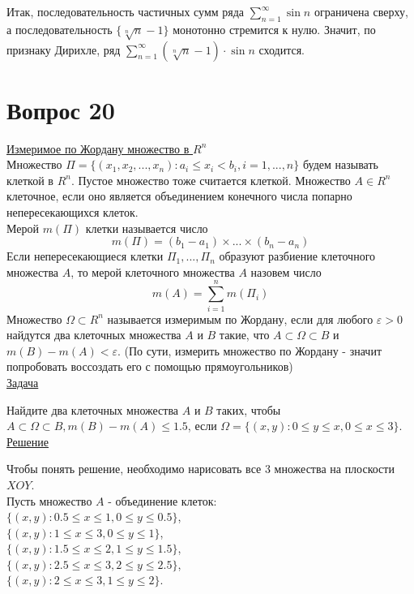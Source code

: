 \documentclass{report}
\begin{document}
Итак, последовательность частичных сумм ряда \( \sum_{n = 1}^{\infty} \sin n \) ограничена сверху, а последовательность \( \{ \sqrt[n]{n} - 1 \} \) монотонно стремится к нулю. Значит, по признаку Дирихле, ряд \( \sum_{n = 1}^{\infty} (\sqrt[n]{n} - 1) \cdot \sin n \) сходится.

\newpage

\section{Вопрос 20}
\underline{Измеримое по Жордану множество в $R^{n}$}\\

Множество $\Pi = \{(x_{1}, x_{2}, ... , x_{n}): a_{i} \leq x_{i} < b_{i}, i = 1, ... , n\}$ будем называть клеткой в $R^{n}$. Пустое множество тоже считается клеткой. Множество $A\in R^{n}$ клеточное, если оно является объединением конечного числа попарно непересекающихся клеток. \\
Мерой $m(\Pi)$ клетки называется число
\[m(\Pi) = (b_{1} - a_{1})\times...\times(b_{n} - a_{n})\]
Если непересекающиеся клетки $\Pi_{1}, ..., \Pi_{n}$ образуют разбиение клеточного множества $A$, то мерой клеточного множества $A$ назовем число
\[m(A) = \sum_{i = 1}^{n} m(\Pi_{i})\]
Множество $\Omega\subset R^{n}$ называется измеримым по Жордану, если для любого $\varepsilon > 0$ найдутся два клеточных множества $A$ и $B$ такие, что $A\subset\Omega\subset B$ и $m(B) - m(A) <\varepsilon$. (По сути, измерить множество по Жордану - значит попробовать воссоздать его с помощью прямоугольников)\\

\underline{Задача}

Найдите два клеточных множества $A$ и $B$ таких, чтобы $A\subset\Omega\subset B, m(B) - m(A) \leq 1.5$, если $\Omega = \{(x,y): 0\leq y \leq x, 0 \leq x \leq 3\}$.\\

\underline{Решение}

Чтобы понять решение, необходимо нарисовать все 3 множества на плоскости $XOY$.\\

Пусть множество $A$ - объединение клеток:\\
$\{(x, y): 0.5 \leq x \leq 1, 0 \leq y \leq 0.5\}$,\\
$\{(x, y): 1 \leq x \leq 3, 0 \leq y \leq 1\}$,\\
$\{(x, y): 1.5 \leq x \leq 2, 1 \leq y \leq 1.5\}$,\\
$\{(x, y): 2.5 \leq x \leq 3, 2 \leq y \leq 2.5\}$,\\
$\{(x, y): 2 \leq x \leq 3, 1 \leq y \leq 2\}$.
\end{document}
